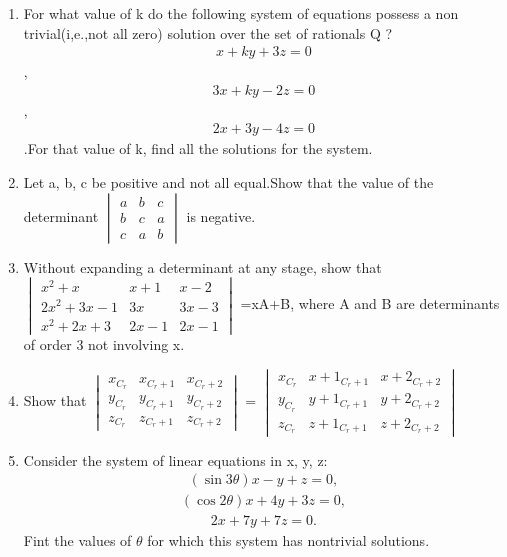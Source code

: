 \begin{enumerate}[label=\arabic*.,ref=\thesubsection.\theenumi]
\begin{enumerate}
\end{enumerate}
\item For what value of k do the following system of equations possess a non trivial(i,e.,not all zero) solution over the set of rationals Q ? 
\begin{align} 
x+ky+3z=0 
\end{align},
\begin{align}
3x+ky-2z=0
\end{align},
\begin{align}
2x+3y-4z=0
\end{align}.For that value of k, find all the solutions for the system.
\item Let a, b, c be positive and not all equal.Show that the value of the determinant $\begin{vmatrix}a & b & c \\ b & c & a \\ c & a & b\end{vmatrix}$ is negative.
\item Without expanding a determinant at any stage, show that 
$\begin{vmatrix}x^2+x & x+1 & x-2 \\ 2x^2+3x-1 & 3x & 3x-3 \\ x^2+2x+3 & 2x-1 & 2x-1\end{vmatrix}$ =xA+B, where A and B are determinants of order 3 not involving x.
\item Show that $\begin{vmatrix} x_{C_r} & x_{C_r+1} & x_{C_r+2} \\ y_{C_r} & y_{C_r+1} & y_{C_r+2} \\ z_{C_r} & z_{C_r+1} & z_{C_r+2}\end{vmatrix}$ =  $\begin{vmatrix}x_{C_r} & x+1_{C_r+1} & x+2_{C_r+2} \\ y_{C_r} & y+1_{C_r+1} & y+2_{C_r+2} \\ z_{C_r} & z+1_{C_r+1} & z+2_{C_r+2}\end{vmatrix}$
\item Consider the system of linear equations in x, y, z:
\begin{align} 
(\sin 3\theta) x-y+z=0,
\end{align}
\begin{align} 
(\cos 2\theta) x+4y+3z=0,
\end{align} 
\begin{align}
2x+7y+7z=0 .
\end{align} Fint the values of $\theta$ for which this system has nontrivial solutions.

\end{enumerate}
